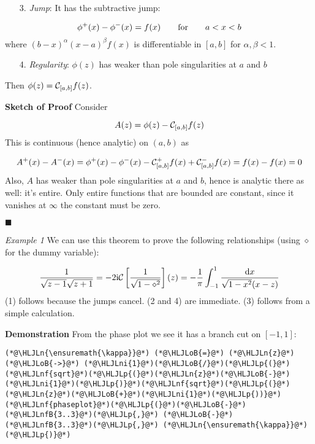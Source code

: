 \documentclass[12pt,landscape]{article}
\newcommand{\HLJLn}[1]{#1}
\newcommand{\HLJLnf}[1]{\textcolor[RGB]{66,102,213}{#1}}
\newcommand{\HLJLnfB}[1]{\textcolor[RGB]{59,151,46}{#1}}
\newcommand{\HLJLni}[1]{\textcolor[RGB]{59,151,46}{#1}}
\newcommand{\HLJLoB}[1]{\textcolor[RGB]{102,102,102}{\textbf{#1}}}
\newcommand{\HLJLp}[1]{#1}
\def\qqfor{\qquad\hbox{for}\qquad}
\def\D{ {\rm d} }
\def\I{ {\rm i} }
\def\dx{\D x}
\begin{document}
{\begin{itemize}
\item[3. ] \emph{Jump}: It has the subtractive jump:

\end{itemize}
\[
\phi^+(x) - \phi^-(x) = f(x) \qqfor a < x < b
\]
where $(b-x)^\alpha (x-a)^\beta f(x)$ is differentiable in $[a,b]$ for $\alpha,\beta < 1$.

\begin{itemize}
\item[4. ] \emph{Regularity}: $\phi(z)$ has weaker than pole singularities at $a$ and $b$

\end{itemize}
Then $\phi(z) = {\cal C}_{[a,b]} f(z)$.
\newpage

\textbf{Sketch of Proof} Consider

\[
A(z) = \phi(z) - {\cal C}_{[a,b]} f(z)
\]
This is continuous (hence analytic) on $(a,b)$ as

\[
A^+(x) - A^-(x) = \phi^+(x) -\phi^-(x) - {\cal C}_{[a,b]}^+ f(x) + {\cal C}_{[a,b]}^- f(x)  =f(x) - f(x) = 0
\]
Also, $A$ has weaker than pole singularities at $a$ and $b$, hence is analytic there as well: it's entire. Only entire functions that are bounded are constant, since it vanishes at $\infty$ the constant must be zero.

\ensuremath{\blacksquare}
\newpage

\emph{Example 1} We can use this theorem to prove the following relationships  (using $\diamond$ for the dummy variable):

\[
{1 \over \sqrt{z-1} \sqrt{z+1}} = -2 \I {\cal C}\left[{1 \over \sqrt{1-\diamond^2}}\right](z) =
-{1 \over \pi}\int_{-1}^1 {\dx \over \sqrt{1-x^2} (x-z)}
\]
(1) follows because the jumps cancel. (2 and 4) are immediate. (3) follows from a simple calculation.

\textbf{Demonstration} From the phase plot we see it has a branch cut on $[-1,1]$:


\begin{lstlisting}
(*@\HLJLn{\ensuremath{\kappa}}@*) (*@\HLJLoB{=}@*) (*@\HLJLn{z}@*) (*@\HLJLoB{->}@*) (*@\HLJLni{1}@*)(*@\HLJLoB{/}@*)(*@\HLJLp{(}@*)(*@\HLJLnf{sqrt}@*)(*@\HLJLp{(}@*)(*@\HLJLn{z}@*)(*@\HLJLoB{-}@*)(*@\HLJLni{1}@*)(*@\HLJLp{)}@*)(*@\HLJLnf{sqrt}@*)(*@\HLJLp{(}@*)(*@\HLJLn{z}@*)(*@\HLJLoB{+}@*)(*@\HLJLni{1}@*)(*@\HLJLp{))}@*)
(*@\HLJLnf{phaseplot}@*)(*@\HLJLp{(}@*)(*@\HLJLoB{-}@*)(*@\HLJLnfB{3..3}@*)(*@\HLJLp{,}@*) (*@\HLJLoB{-}@*)(*@\HLJLnfB{3..3}@*)(*@\HLJLp{,}@*) (*@\HLJLn{\ensuremath{\kappa}}@*)(*@\HLJLp{)}@*)
\end{lstlisting}
\newpage

}
\end{document}
